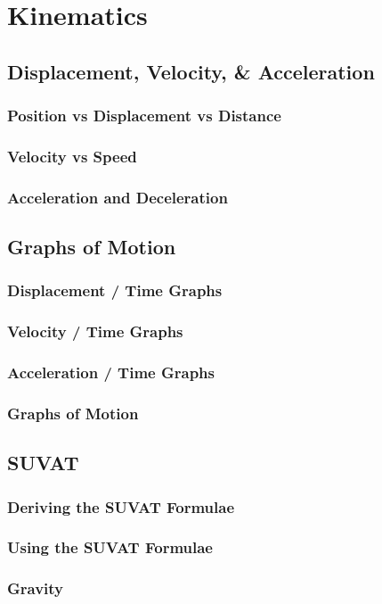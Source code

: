 \documentclass[../alevelmaths.tex]{subfiles}
\begin{document}
\chapter{Kinematics}
\section{Displacement, Velocity, \& Acceleration}
\subsection*{Position vs Displacement vs Distance}
\subsection*{Velocity vs Speed}
\subsection*{Acceleration and Deceleration}
\section{Graphs of Motion}
\subsection*{Displacement / Time Graphs}
\subsection*{Velocity / Time Graphs}
\subsection*{Acceleration / Time Graphs}
\subsection*{Graphs of Motion}
\section{SUVAT}
\subsection*{Deriving the SUVAT Formulae}
\subsection*{Using the SUVAT Formulae}
\subsection*{Gravity}
\end{document}
